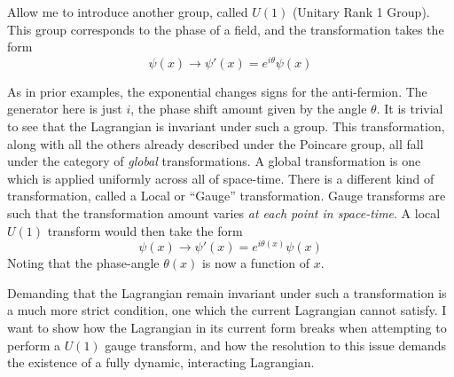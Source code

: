    Allow me to introduce another group, called $U(1)$ (Unitary Rank 1 Group).
    This group corresponds to the phase of a field, and the transformation takes the form
    \begin{equation}
        \psi(x) \to \psi'(x) = e^{i\theta} \psi(x)
    \end{equation}

    As in prior examples, the exponential changes signs for the anti-fermion.
    The generator here is just $i$, the phase shift amount given by the angle $\theta$.
    It is trivial to see that the Lagrangian is invariant under such a group.
    This transformation, along with all the others already described under the Poincare group,
        all fall under the category of \textit{global} transformations.
    A global transformation is one which is applied uniformly across all of space-time.
    There is a different kind of transformation, called a Local or ``Gauge'' transformation.
    Gauge transforms are such that the transformation amount varies \textit{at each point in space-time}.
    A local $U(1)$ transform would then take the form 
    \begin{equation}
        \psi(x) \to \psi'(x) = e^{i\theta(x)} \psi(x)
    \end{equation}
    Noting that the phase-angle $\theta(x)$ is now a function of $x$.

    Demanding that the Lagrangian remain invariant under such a transformation is a much more strict condition,
        one which the current Lagrangian cannot satisfy.
    I want to show how the Lagrangian in its current form breaks when attempting to perform a $U(1)$ gauge transform,
        and how the resolution to this issue demands the existence of a fully dynamic, interacting Lagrangian.

